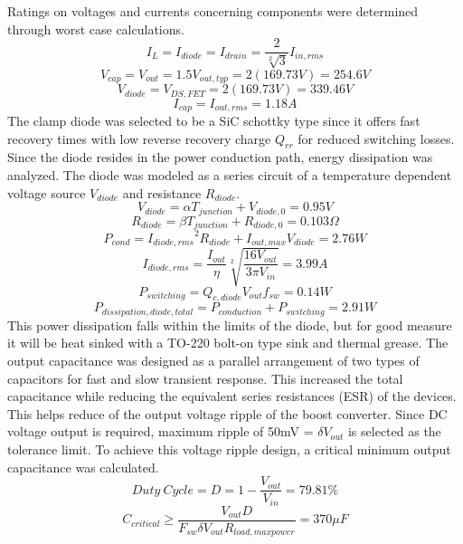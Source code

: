 Ratings on voltages and currents concerning components were determined through worst case calculations.\cite{kwasinski} 
\begin{equation}
I_L = I_{diode} = I_{drain} = \frac{2}{\sqrt[2]{3}}I_{in,rms} 
\end{equation}
\begin{equation}
 V_{cap} = V_{out} = 1.5V_{out,typ} = 2(169.73V) = 254.6V 
\end{equation}
\begin{equation}
 V_{diode} = V_{DS,FET} = 2(169.73V) =339.46V  
\end{equation}
\begin{equation}
I_{cap} = I_{out,rms} = 1.18A 
\end{equation}
The clamp diode was selected to be a SiC schottky type since it offers fast recovery times with low reverse recovery charge $Q_{rr}$ for reduced switching losses. Since the diode resides in the power conduction path, energy dissipation was analyzed. The diode was modeled as a series circuit of a temperature dependent voltage source $ V_{diode}$ and resistance $R_{diode}$.\cite{CREE}
\begin{equation}
 V_{diode} = \alpha T_{junction}+V_{diode,0} =  0.95V 
\end{equation}
\begin{equation}
 R_{diode} = \beta T_{junction}+R_{diode,0} = 0.103\Omega
\end{equation}
\begin{equation}
 P_{cond} = {I_{diode,rms}}^2R_{diode}+I_{out,max}V_{diode} = 2.76W
\end{equation}
\begin{equation}
 I_{diode,rms} = \frac{I_{out}}{\eta} \sqrt[2]{ \frac{16V_{out}}{3 \pi V_{in}}}= 3.99A
\end{equation}
\begin{equation}
P_{switching} = Q_{c,diode}V_{out}f_{sw}=0.14W
\end{equation}
\begin{equation}
 P_{dissipation,diode,total}= P_{conduction}+P_{switching}=2.91W 
\end{equation}
This power dissipation falls within the limits of the diode, but for good measure it will be heat sinked with a TO-220 bolt-on type sink and thermal grease. 
	The output capacitance was designed as a parallel arrangement of two types of capacitors for fast and slow transient response. This increased the total capacitance while reducing the equivalent series resistances (ESR) of the devices. This helps reduce of the output voltage ripple of the boost converter. Since DC voltage output is required, maximum ripple of 50mV = $\delta V_{out}$ is selected as the tolerance limit. To achieve this voltage ripple design, a critical minimum output capacitance was calculated.%
\begin{equation}
Duty~Cycle = D= 1 - \frac{V_{out}}{V_{in}} = 79.81\% 
\end{equation}
\begin{equation}
C_{critical} \ge \frac{V_{out}D}{F_{sw}\delta V_{out}R_{load,maxpower}} = 370 \mu F
\end{equation}


